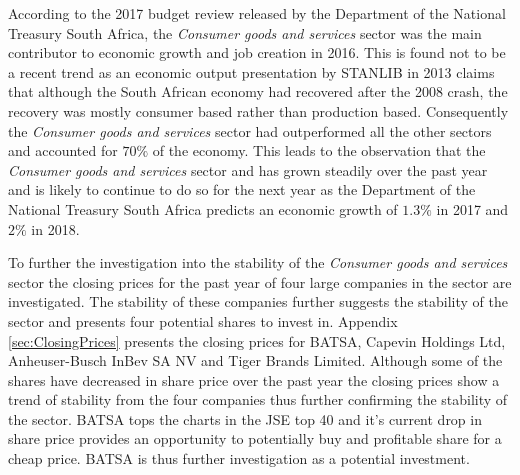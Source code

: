 \documentclass[letterpaper, 10 pt, conference]{ieeeconf}  %
\begin{document}
According to the 2017 budget review \cite{budgetReview} released by the Department of the National Treasury South Africa, the \textit{Consumer goods and services} sector was the main contributor to economic growth and job creation in 2016. This is found not to be a recent trend as an economic output presentation by STANLIB in 2013 \cite{stanlibReport} claims that although the South African economy had recovered after the 2008 crash, the recovery was mostly consumer based rather than production based. Consequently the \textit{Consumer goods and services} sector had outperformed all the other sectors and accounted for $70\%$ of the economy. This leads to the observation that the \textit{Consumer goods and services} sector and has grown steadily over the past year and is likely to continue to do so for the next year as the Department of the National Treasury South Africa predicts an economic growth of $1.3\%$ in 2017 and $2\%$ in 2018.

To further the investigation into the stability of the \textit{Consumer goods and services} sector the closing prices for the past year of four large companies in the sector are investigated. The stability of these companies further suggests the stability of the sector and presents four potential shares to invest in. Appendix \ref{sec:ClosingPrices} presents the closing prices for BATSA,  Capevin Holdings Ltd, Anheuser-Busch InBev SA NV and Tiger Brands Limited. Although some of the shares have decreased in share price over the past year the closing prices show a trend of stability from the four companies thus further confirming the stability of the sector. BATSA tops the charts in the JSE top 40 \cite{top40} and it's current drop in share price provides an opportunity to potentially buy and profitable share for a cheap price. BATSA is thus further investigation as a potential investment.
 
 
\end{document}
